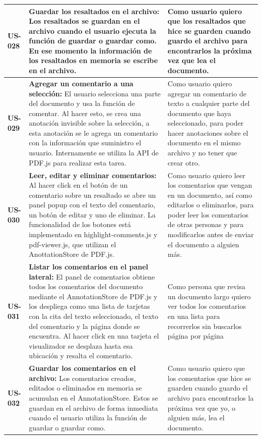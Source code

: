 \begin{longtable}{|l||p{7cm}|p{4.5cm}|}
\hline
\textbf{US-028} & \textbf{Guardar los resaltados en el archivo:} Los resaltados se guardan en el archivo cuando el usuario ejecuta la función de guardar o guardar como. En ese momento la información de los resaltados en memoria se escribe en el archivo. & Como usuario quiero que los resaltados que hice se guarden cuando guardo el archivo para encontrarlos la próxima vez que lea el documento.\\
\hline
\textbf{US-029} & \textbf{Agregar un comentario a una selección:} El usuario selecciona una parte del documento y usa la función de comentar. Al hacer esto, se crea una anotación invisible sobre la selección, a esta anotación se le agrega un comentario con la información que suministro el usuario. Internamente se utiliza la API de PDF.js para realizar esta tarea. & Como usuario quiero agregar un comentario de texto a cualquier parte del documento que haya seleccionado, para poder hacer anotaciones sobre el documento en el mismo archivo y no tener que crear otro.\\
\hline
\textbf{US-030} & \textbf{Leer, editar y eliminar comentarios:} Al hacer click en el botón de un comentario sobre un resaltado se abre un panel popup con el texto del comentario, un botón de editar y uno de eliminar. La funcionalidad de los botones está implementado en highlight-comments.js y pdf-viewer.js, que utilizan el AnottationStore de PDF.js. & Como usuario quiero leer los comentarios que vengan en un documento, así como editarlos o eliminarlos, para poder leer los comentarios de otras personas y para modificarlos antes de enviar el documento a alguien más.\\
\hline
\textbf{US-031} & \textbf{Listar los comentarios en el panel lateral:} El panel de comentarios obtiene todos los comentarios del documento mediante el AnnotationStore de PDF.js y los despliega como una lista de tarjetas con la cita del texto seleccionado, el texto del comentario y la página donde se encuentra. Al hacer click en una tarjeta el visualizador se desplaza hasta esa ubicación y resalta el comentario. & Como persona que revisa un documento largo quiero ver todos los comentarios en una lista para recorrerlos sin buscarlos página por página\\
\hline
\textbf{US-032} & \textbf{Guardar los comentarios en el archivo:} Los comentarios creados, editados o eliminados en memoria se acumulan en el AnnotationStore. Estos se guardan en el archivo de forma inmediata cuando el usuario utiliza la función de guardar o guardar como. & Como usuario quiero que los comentarios que hice se guarden cuando guardo el archivo para encontrarlos la próxima vez que yo, o alguien más, lea el documento.\\

\end{longtable}
